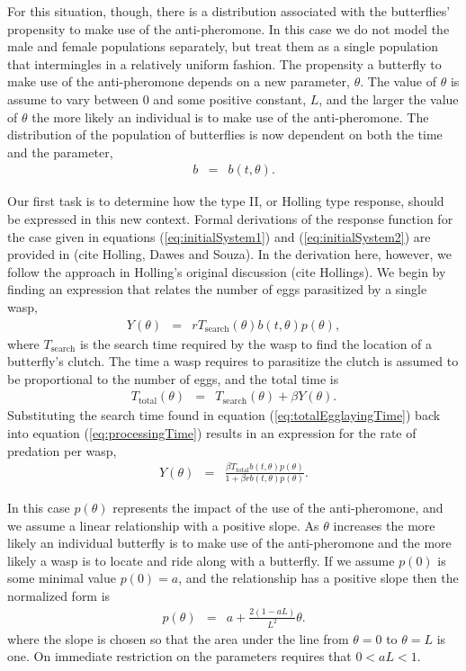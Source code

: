\documentclass[12pt]{article}
\begin{document}
For this situation, though, there is a distribution associated with
the butterflies' propensity to make use of the anti-pheromone. In this
case we do not model the male and female populations separately, but
treat them as a single population that intermingles in a relatively
uniform fashion. The propensity a butterfly to make use of the
anti-pheromone depends on a new parameter, $\theta$. The value of
$\theta$ is assume to vary between $0$ and some positive constant,
$L$, and the larger the value of $\theta$ the more likely an
individual is to make use of the anti-pheromone. The distribution of
the population of butterflies is now dependent on both the time and
the parameter,
\begin{eqnarray}
  b & = & b(t,\theta).
\end{eqnarray}

Our first task is to determine how the type II, or Holling type
response, should be expressed in this new context. Formal derivations
of the response function for the case given in equations
(\ref{eq:initialSystem1}) and (\ref{eq:initialSystem2}) are provided in
(cite Holling, Dawes and Souza). In the derivation here, however,
we follow the approach in Holling's original discussion (cite
Hollings). We begin by finding an expression that relates the number
of eggs parasitized by a single wasp,
\begin{eqnarray}
  \label{eq:processingTime}
  Y(\theta) & = & r T_{\mathrm{search}}(\theta) b(t,\theta) p(\theta),
\end{eqnarray}
where $T_{\mathrm{search}}$ is the search time required by the wasp to
find the location of a butterfly's clutch. The time a wasp requires to
parasitize the clutch is assumed to be proportional to the number of
eggs, and the total time is
\begin{eqnarray}
  \label{eq:totalEgglayingTime}
  T_{\mathrm{total}}(\theta) & = & T_{\mathrm{search}}(\theta) + \beta Y(\theta).
\end{eqnarray}
Substituting the search time found in equation
(\ref{eq:totalEgglayingTime}) back into equation
(\ref{eq:processingTime}) results in an expression for the rate of
predation per wasp,
\begin{eqnarray}
  \label{eq:waspPredationRate}
  Y(\theta) & = & \frac{\beta T_{\mathrm{total}} b(t,\theta) p(\theta)}{1 + \beta r b(t,\theta) p(\theta)}.
\end{eqnarray}

In this case $p(\theta)$ represents the impact of the use of the
anti-pheromone, and we assume a linear relationship with a positive
slope. As $\theta$ increases the more likely an individual butterfly
is to make use of the anti-pheromone and the more likely a wasp is to
locate and ride along with a butterfly. If we assume $p(0)$ is some
minimal value $p(0)=a$, and the relationship has a positive slope then
the normalized form is
\begin{eqnarray}
  \label{eq:linearFormP}
  p(\theta) & = & a + \frac{2(1-aL)}{L^2} \theta.
\end{eqnarray}
where the slope is chosen so that the area under the line from
$\theta=0$ to $\theta=L$ is one. On immediate restriction on the
parameters requires that $0<aL<1$.
\end{document}
